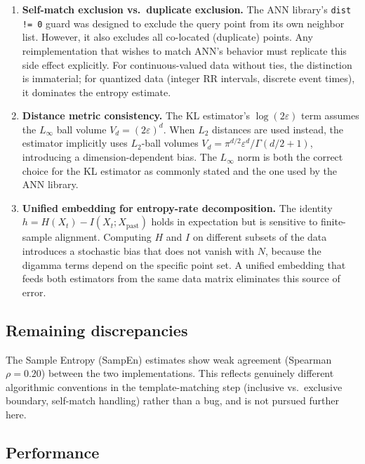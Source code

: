 \documentclass[12pt,a4paper]{article}
\begin{document}
\begin{enumerate}
  \item \textbf{Self-match exclusion vs.\ duplicate exclusion.}
  The ANN library's \texttt{dist != 0} guard was designed to exclude the query point from its own neighbor list.
  However, it also excludes all co-located (duplicate) points.
  Any reimplementation that wishes to match ANN's behavior must replicate this side effect explicitly.
  For continuous-valued data without ties, the distinction is immaterial; for quantized data (integer RR intervals, discrete event times), it dominates the entropy estimate.

  \item \textbf{Distance metric consistency.}
  The KL estimator's $\log(2\varepsilon)$ term assumes the $L_\infty$ ball volume $V_d = (2\varepsilon)^d$.
  When $L_2$ distances are used instead, the estimator implicitly uses $L_2$-ball volumes $V_d = \pi^{d/2} \varepsilon^d / \Gamma(d/2 + 1)$, introducing a dimension-dependent bias.
  The $L_\infty$ norm is both the correct choice for the KL estimator as commonly stated and the one used by the ANN library.

  \item \textbf{Unified embedding for entropy-rate decomposition.}
  The identity $h = H(X_t) - I(X_t; X_{\mathrm{past}})$ holds in expectation but is sensitive to finite-sample alignment.
  Computing $H$ and $I$ on different subsets of the data introduces a stochastic bias that does not vanish with $N$, because the digamma terms depend on the specific point set.
  A unified embedding that feeds both estimators from the same data matrix eliminates this source of error.
\end{enumerate}

\subsection{Remaining discrepancies}

The Sample Entropy (SampEn) estimates show weak agreement (Spearman $\rho = 0.20$) between the two implementations.
This reflects genuinely different algorithmic conventions in the template-matching step (inclusive vs.\ exclusive boundary, self-match handling) rather than a bug, and is not pursued further here.

\subsection{Performance}
\end{document}
